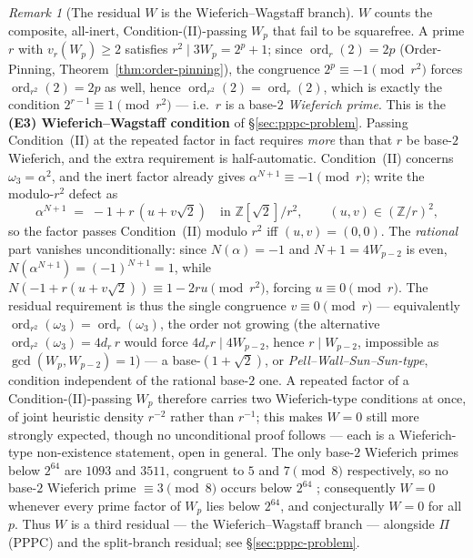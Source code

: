 \documentclass[11pt]{amsart}
\theoremstyle{plain}
\theoremstyle{definition}
\theoremstyle{remark}
\newtheorem{remark}[theorem]{Remark}
\numberwithin{equation}{section}
\newcommand{\ord}{\operatorname{ord}}
\newcommand{\Z}{\mathbb{Z}}
\begin{document}
\begin{remark}[The residual $W$ is the Wieferich--Wagstaff branch]\label{rem:wieferich}
$W$ counts the composite, all-inert, Condition-(II)-passing $W_p$ that fail to be squarefree. A prime $r$ with $v_r(W_p) \geq 2$ satisfies $r^2 \mid 3 W_p = 2^p + 1$; since $\ord_r(2) = 2 p$ (Order-Pinning, Theorem~\ref{thm:order-pinning}), the congruence $2^p \equiv -1 \pmod{r^2}$ forces $\ord_{r^2}(2) = 2 p$ as well, hence $\ord_{r^2}(2) = \ord_r(2)$, which is exactly the condition $2^{r-1} \equiv 1 \pmod{r^2}$ --- i.e.\ $r$ is a base-$2$ \emph{Wieferich prime}. This is the \textbf{(E3) Wieferich--Wagstaff condition} of \S\ref{sec:pppc-problem}. Passing Condition~(II) at the repeated factor in fact requires \emph{more} than that $r$ be base-$2$ Wieferich, and the extra requirement is half-automatic. Condition~(II) concerns $\omega_3 = \alpha^2$, and the inert factor already gives $\alpha^{N+1} \equiv -1 \pmod r$; write the modulo-$r^2$ defect as
\[
  \alpha^{N+1} \;=\; -1 + r\,(u + v\sqrt 2) \quad\text{in } \Z[\sqrt 2]/r^2, \qquad (u, v) \in (\Z/r)^2,
\]
so the factor passes Condition~(II) modulo $r^2$ iff $(u, v) = (0, 0)$. The \emph{rational} part vanishes unconditionally: since $N(\alpha) = -1$ and $N + 1 = 4 W_{p-2}$ is even, $N(\alpha^{N+1}) = (-1)^{N+1} = 1$, while $N(-1 + r(u + v\sqrt 2)) \equiv 1 - 2 r u \pmod{r^2}$, forcing $u \equiv 0 \pmod r$. The residual requirement is thus the single congruence $v \equiv 0 \pmod r$ --- equivalently $\ord_{r^2}(\omega_3) = \ord_r(\omega_3)$, the order not growing (the alternative $\ord_{r^2}(\omega_3) = 4 d_r\, r$ would force $4 d_r r \mid 4 W_{p-2}$, hence $r \mid W_{p-2}$, impossible as $\gcd(W_p, W_{p-2}) = 1$) --- a base-$(1+\sqrt 2)$, or \emph{Pell--Wall--Sun--Sun-type}, condition independent of the rational base-$2$ one. A repeated factor of a Condition-(II)-passing $W_p$ therefore carries two Wieferich-type conditions at once, of joint heuristic density $r^{-2}$ rather than $r^{-1}$; this makes $W = 0$ still more strongly expected, though no unconditional proof follows --- each is a Wieferich-type non-existence statement, open in general. The only base-$2$ Wieferich primes below $2^{64}$ are $1093$ and $3511$, congruent to $5$ and $7 \pmod 8$ respectively, so no base-$2$ Wieferich prime $\equiv 3 \pmod 8$ occurs below $2^{64}$ \cite{ref:OEISWieferich}; consequently $W = 0$ whenever every prime factor of $W_p$ lies below $2^{64}$, and conjecturally $W = 0$ for all $p$. Thus $W$ is a third residual --- the Wieferich--Wagstaff branch --- alongside $\Pi$ (PPPC) and the split-branch residual; see \S\ref{sec:pppc-problem}.
\end{remark}
\end{document}
